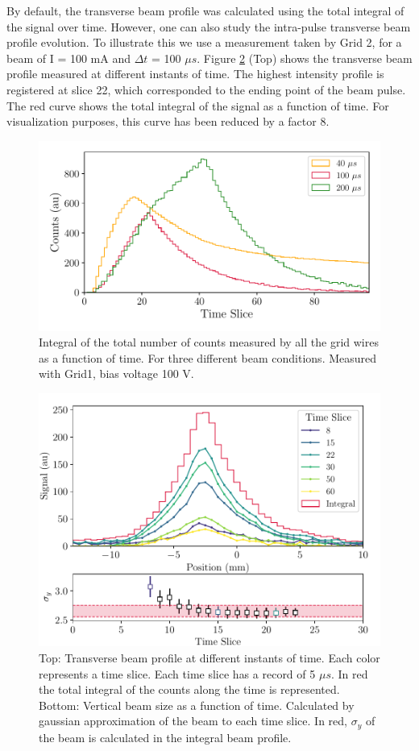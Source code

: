 By default, the transverse beam profile was calculated using the total integral of the signal over time. However, one can also study the intra-pulse transverse beam profile evolution. To illustrate this we use a measurement taken by Grid 2, for a beam of I = 100 mA and $\Delta t$ = 100 $\mu s$. Figure \ref{fig:SigmaEvolutionTime} (Top) shows the transverse beam profile measured at different instants of time. The highest intensity profile is registered at slice 22, which corresponded to the ending point of the beam pulse. The red curve shows the total integral of the signal as a function of time. For visualization purposes, this curve has been reduced by a factor 8.

\begin{figure}[h]
    \vspace{-0.2cm}
    \centering
    \includegraphics[width=0.8\columnwidth]{TimeEvolProj/TimeEvolutionProj.pdf}
    \caption{Integral of the total number of counts measured by all the grid wires as a function of time. For three different beam conditions. Measured with Grid1, bias voltage 100 V. }
    \label{fig:TimeDepProje}
\end{figure}
\vspace{-0.5cm}
\begin{figure}[h!]
    \centering
    \includegraphics[width=0.8\columnwidth]{BeamProfileWithTime/BeamSigmaWithTime.pdf}
    \caption{Top: Transverse beam profile at different instants of time. Each color represents a time slice. Each time slice has a record of 5 $\mu s$. In red the total integral of the counts along the time is represented. Bottom: Vertical beam size as a function of time. Calculated by gaussian approximation of the beam to each time slice. In red, $\sigma_y$ of the beam is calculated in the integral beam profile. }
    \label{fig:SigmaEvolutionTime}
\end{figure}

